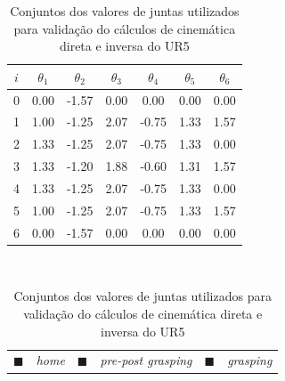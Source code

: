 \begin{table}[htp!]
	\centering
	\caption{Conjuntos dos valores de juntas utilizados para validação do cálculos de cinemática direta e 
		inversa do UR5
	}
	\label{tab:conjuntos-de-valores-de-juntas-recortado}
	\begin{tabular}{c|c|c|c|c|c|c}
		\hline
		\rowcolor{white} 					$i$ & $\theta_{1} $ & $\theta_{2}$ & $\theta_{3}$ & $\theta_{4}$ & $\theta_{5}$ & $\theta_{6}$ \\ 
		\hline 
		\rowcolor{home-gray} 				0  &    0.00       &     -1.57    &     0.00     &     0.00     &     0.00     &     0.00     \\ 
		\hline 
		\rowcolor{pre-post-grasping-gray} 	1  &    1.00       &     -1.25    &     2.07     &     -0.75    &     1.33     &     1.57     \\ 
		\hline 
		\rowcolor{pre-post-grasping-gray} 	2  &    1.33       &     -1.25    &     2.07     &     -0.75    &     1.33     &     0.00     \\ 
		\hline 
		\rowcolor{grasping-gray} 		    3  &    1.33       &     -1.20    &     1.88     &     -0.60    &     1.31     &     1.57     \\ 
		\hline 
		\rowcolor{pre-post-grasping-gray} 	4  &    1.33       &     -1.25    &     2.07     &     -0.75    &     1.33     &     0.00     \\ 
		\hline
		\rowcolor{pre-post-grasping-gray} 	5  &    1.00       &     -1.25    &     2.07     &     -0.75    &     1.33     &     1.57     \\ 
		\hline
		\rowcolor{home-gray} 				6  &    0.00       &     -1.57    &     0.00     &     0.00     &     0.00     &     0.00     \\ 
		\hline
	\end{tabular}
	\\
	\begin{tabular}{cccccc}
		\textcolor{home-gray}{$\blacksquare$} & \textit{home} &
		\textcolor{pre-post-grasping-gray}{$\blacksquare$} & \textit{pre-post grasping} &
		\textcolor{grasping-gray}{$\blacksquare$} & \textit{grasping} \\
	\end{tabular}
\end{table}


